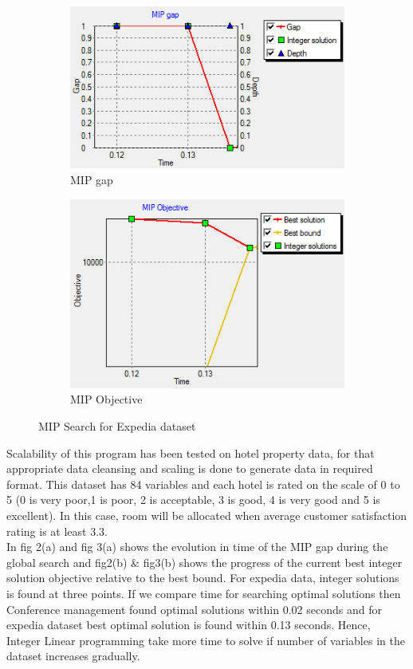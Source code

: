 \documentclass[paper=a4, fontsize=11pt]{scrartcl} %
\begin{document}
\begin{figure}[ht]
\centering
\begin{subfigure}{.5\textwidth}
  \centering
  \includegraphics[scale=.8]{g3.png}
  \caption{MIP gap}
  \label{fig:sub1}
\end{subfigure}%
\begin{subfigure}{.5\textwidth}
  \centering
  \includegraphics[scale=.7]{g4.png}
  \caption{MIP Objective}
  \label{fig:sub2}
\end{subfigure}
\caption{MIP Search for Expedia dataset } 
\label{fig:test}
\end{figure}

Scalability of this program has been tested on hotel property data, for that appropriate data cleansing and scaling is done  to generate data in required format. This dataset has 84 variables and each hotel is rated on the scale of 0 to 5 (0 is very poor,1 is poor, 2 is acceptable, 3 is good, 4 is very good and  5 is excellent). In this case, room will be allocated when average customer satisfaction rating is at least 3.3.\\

In fig 2(a) and fig 3(a) shows the evolution in time of the MIP gap during the global search and fig2(b) \& fig3(b) shows the progress of the current best integer solution objective relative to the best bound. For expedia data, integer solutions is found at three points. If we compare time for searching optimal solutions then Conference management found optimal solutions within 0.02 seconds and for expedia dataset best optimal solution is found within 0.13 seconds. Hence, Integer Linear programming take more time to solve if number of variables in the dataset increases gradually.\\
\end{document}
